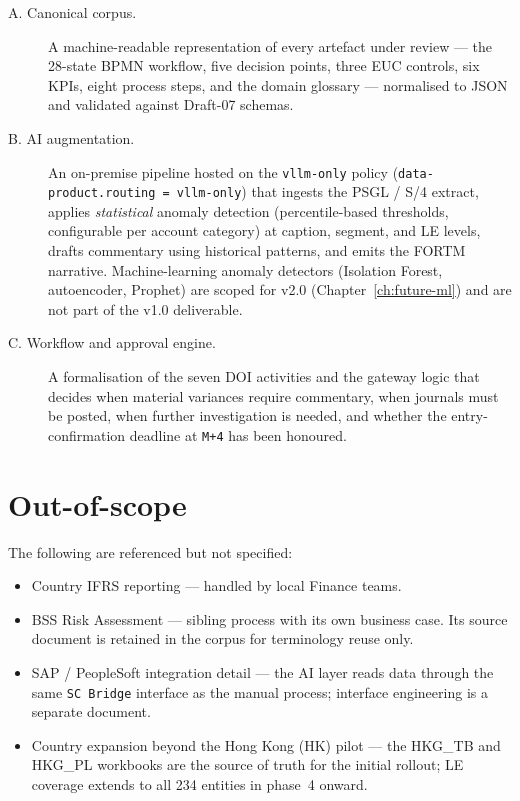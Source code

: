 \begin{description}
  \item[A. Canonical corpus.] A machine-readable representation of
        every artefact under review --- the 28-state BPMN workflow,
        five decision points, three EUC controls, six KPIs, eight
        process steps, and the domain glossary --- normalised to JSON
        and validated against Draft-07 schemas.
  \item[B. AI augmentation.] An on-premise pipeline hosted on the
        \texttt{vllm-only} policy (\texttt{data-product.routing = vllm-only})
        that ingests the PSGL / S/4 extract, applies
        \emph{statistical} anomaly detection (percentile-based
        thresholds, configurable per account category) at caption,
        segment, and LE levels, drafts commentary using historical
        patterns, and emits the FORTM narrative. Machine-learning
        anomaly detectors (Isolation Forest, autoencoder, Prophet)
        are scoped for v2.0 (Chapter~\ref{ch:future-ml}) and are
        not part of the v1.0 deliverable.
  \item[C. Workflow and approval engine.] A formalisation of the seven
        DOI activities and the gateway logic that decides when
        material variances require commentary, when journals must be
        posted, when further investigation is needed, and whether the
        entry-confirmation deadline at \texttt{M+4} has been honoured.
\end{description}

\section{Out-of-scope}

The following are referenced but not specified:

\begin{itemize}
  \item Country IFRS reporting --- handled by local Finance teams.
  \item BSS Risk Assessment --- sibling process with its own business
        case. Its source document is retained in the corpus for
        terminology reuse only.
  \item SAP / PeopleSoft integration detail --- the AI layer reads
        data through the same \texttt{SC Bridge} interface as the
        manual process; interface engineering is a separate document.
  \item Country expansion beyond the Hong Kong (HK) pilot --- the
        HKG\_TB and HKG\_PL workbooks are the source of truth for the
        initial rollout; LE coverage extends to all 234 entities in
        phase~4 onward.
\end{itemize}

